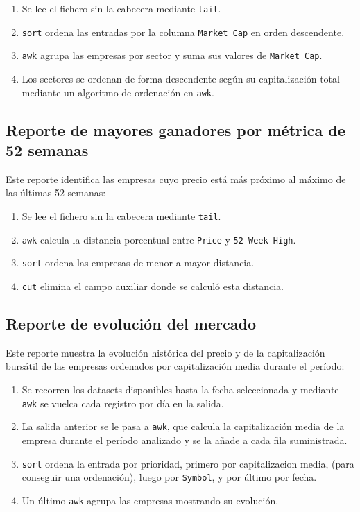 \documentclass[11pt,a4paper]{article}
\begin{document}
\begin{enumerate}[noitemsep]
\item Se lee el fichero sin la cabecera mediante \texttt{tail}.
\item \texttt{sort} ordena las entradas por la columna \texttt{Market Cap} en orden descendente.
\item \texttt{awk} agrupa las empresas por sector y suma sus valores de \texttt{Market Cap}.
\item Los sectores se ordenan de forma descendente según su capitalización total mediante un algoritmo de ordenación en \texttt{awk}. 
\end{enumerate}

\subsection{Reporte de mayores ganadores por métrica de 52 semanas}

Este reporte identifica las empresas cuyo precio está más próximo al máximo de las últimas 52 semanas:

\begin{enumerate}[noitemsep]
\item Se lee el fichero sin la cabecera mediante \texttt{tail}.
\item \texttt{awk} calcula la distancia porcentual entre \texttt{Price} y
\texttt{52 Week High}.
\item \texttt{sort} ordena las empresas de menor a mayor distancia.
\item \texttt{cut} elimina el campo auxiliar donde se calculó esta distancia.
\end{enumerate}

\subsection{Reporte de evolución del mercado}

Este reporte muestra la evolución histórica del precio y de la capitalización bursátil de las empresas ordenados por capitalización media durante el período:

\begin{enumerate}[noitemsep]
\item Se recorren los datasets disponibles hasta la fecha seleccionada y mediante \texttt{awk} se vuelca cada registro por día en la salida.
\item La salida anterior se le pasa a \texttt{awk}, que calcula la capitalización media de la empresa durante el período analizado y se la añade a cada fila suministrada.
\item \texttt{sort} ordena la entrada por prioridad, primero por capitalizacion media, (para conseguir una ordenación), luego por \texttt{Symbol}, y por último por fecha.
\item Un último \texttt{awk} agrupa las empresas mostrando su evolución.
\end{enumerate}
\end{document}
